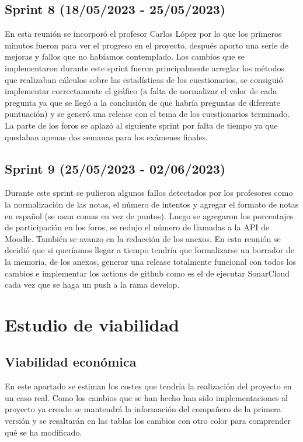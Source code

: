 \subsection{Sprint 8 (18/05/2023 - 25/05/2023)}
	En esta reunión se incorporó el profesor Carlos López por lo que los primeros minutos fueron para ver el progreso en el proyecto, después aporto una serie de mejoras y fallos que no habíamos contemplado. Los cambios que se implementaron durante este sprint fueron principalmente arreglar los métodos que realizaban cálculos sobre las estadísticas de los cuestionarios, se consiguió implementar correctamente el gráfico (a falta de normalizar el valor de cada pregunta ya que se llegó a la conclusión de que habría preguntas de diferente puntuación) y se generó una release con el tema de los cuestionarios terminado. La parte de los foros se aplazó al siguiente sprint por falta de tiempo ya que quedaban apenas dos semanas para los exámenes finales.

\subsection{Sprint 9 (25/05/2023 - 02/06/2023)}
	Durante este sprint se pulieron algunos fallos detectados por los profesores como la normalización de las notas, el número de intentos y agregar el formato de notas en español (se usan comas en vez de puntos). Luego se agregaron los porcentajes de participación en los foros, se redujo el número de llamadas a la API de Moodle. También se avanzo en la redacción de los anexos. En esta reunión se decidió que si queríamos llegar a tiempo tendría que formalizarse un borrador de la memoria, de los anexos, generar una release totalmente funcional con todos los cambios e implementar los actions de github como es el de ejecutar SonarCloud cada vez que se haga un push a la rama develop.

\section{Estudio de viabilidad}

\subsection{Viabilidad económica}
En este apartado se estiman los costes que tendría la realización del proyecto en un caso real. Como los cambios que se han hecho han sido implementaciones al proyecto ya creado se mantendrá la información del compañero de la primera versión\cite{previotfganexos} y se resaltarán en las tablas los cambios con otro color para comprender qué se ha modificado.

